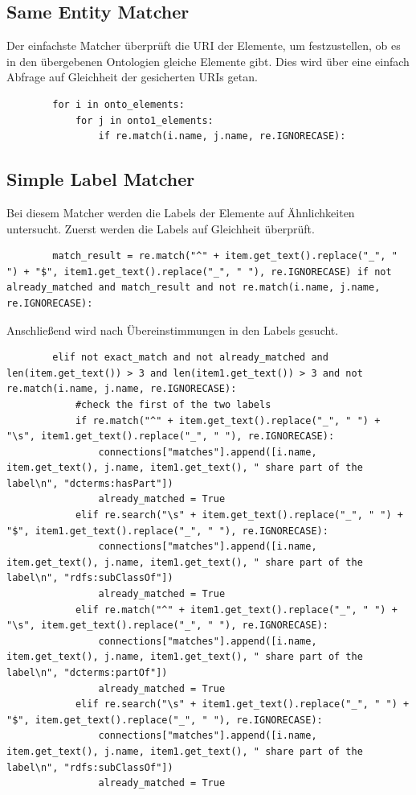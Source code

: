 		\subsection{Same Entity Matcher}
		Der einfachste Matcher überprüft die URI der Elemente, um festzustellen, ob es
		in den übergebenen Ontologien gleiche Elemente gibt. Dies wird über eine
		einfach Abfrage auf Gleichheit der gesicherten URIs getan.
		\begin{lstlisting}
		for i in onto_elements:
			for j in onto1_elements:
				if re.match(i.name, j.name, re.IGNORECASE):
		\end{lstlisting}
		
		\subsection{Simple Label Matcher}
		\label{simpleOntologyMatcher}
		Bei diesem Matcher werden die Labels der Elemente auf Ähnlichkeiten
		untersucht.
		Zuerst werden die Labels auf Gleichheit überprüft.
		\begin{lstlisting}
		match_result = re.match("^" + item.get_text().replace("_", " ") + "$", item1.get_text().replace("_", " "), re.IGNORECASE) if not already_matched and match_result and not re.match(i.name, j.name, re.IGNORECASE):
		\end{lstlisting}
		Anschließend wird nach Übereinstimmungen in den Labels gesucht.
		\begin{lstlisting}
		elif not exact_match and not already_matched and len(item.get_text()) > 3 and len(item1.get_text()) > 3 and not re.match(i.name, j.name, re.IGNORECASE):
            #check the first of the two labels
            if re.match("^" + item.get_text().replace("_", " ") + "\s", item1.get_text().replace("_", " "), re.IGNORECASE):
                connections["matches"].append([i.name, item.get_text(), j.name, item1.get_text(), " share part of the label\n", "dcterms:hasPart"])
                already_matched = True
            elif re.search("\s" + item.get_text().replace("_", " ") + "$", item1.get_text().replace("_", " "), re.IGNORECASE):
                connections["matches"].append([i.name, item.get_text(), j.name, item1.get_text(), " share part of the label\n", "rdfs:subClassOf"])
                already_matched = True
            elif re.match("^" + item1.get_text().replace("_", " ") + "\s", item.get_text().replace("_", " "), re.IGNORECASE):
                connections["matches"].append([i.name, item.get_text(), j.name, item1.get_text(), " share part of the label\n", "dcterms:partOf"])
                already_matched = True
            elif re.search("\s" + item1.get_text().replace("_", " ") + "$", item.get_text().replace("_", " "), re.IGNORECASE):
                connections["matches"].append([i.name, item.get_text(), j.name, item1.get_text(), " share part of the label\n", "rdfs:subClassOf"])
                already_matched = True
		\end{lstlisting}
